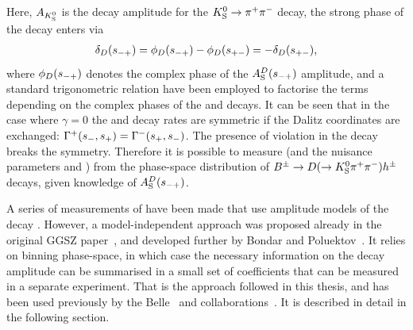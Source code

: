 Here, $A_{{K}^0_{\mathrm{S}}}$ is the decay amplitude for the ${{K}^0_{\mathrm{S}}}\rightarrow{\ensuremath{{\pi}^+}}{\ensuremath{{\pi}^-}}$ decay, the strong phase of the \D decay enters via 
\begin{align}
    {\delta_\D(\smp) = \phi_D(\smp) - \phi_D(\spm) = - \delta_D(\spm)},
\end{align} where $\phi_D(s_{-+})$ denotes the complex phase of the $A_{\rm S}^{D}(s_{-+})$ amplitude, and a standard trigonometric relation have been employed to factorise the terms depending on the complex phases of the \B and \D decays. It can be seen that in the case where $\gamma=0$ the \Bp and \Bm decay rates are symmetric if the Dalitz coordinates are exchanged: $\Gamma^+(s_-, s_+)=\Gamma^-(s_+, s_-)$. The presence of \CP violation in the \B decay breaks the symmetry. Therefore it is possible to measure \g (and the nuisance parameters \rB and \dB) from the phase-space distribution of ${{B}^\pm}\rightarrow{\ensuremath{D}}(\rightarrow{\ensuremath{{K}^0_{\mathrm{S}}}} \pi^+ \pi^-)h^\pm$ decays, given knowledge of $A_{\rm S}^{D}(s_{-+})$.

A series of measurements of \g have been made that use amplitude models of the \D decay \cite{BABAR2005,BABAR2008,BABAR2010, BELLE2004,BELLE2006,BELLE2010,LHCb-PAPER-2014-017,LHCb-PAPER-2016-007}. However, 
a model-independent approach was proposed already in the original GGSZ paper~\cite{giriDeterminingGammaUsing2003}, and developed further by Bondar and Poluektov~\cite{bondarFeasibilityStudyModelindependent2006,bondarUseQuantumcorrelatedD02008}. It relies on binning phase-space, in which case the necessary information on the \D decay amplitude can be summarised in a small set of coefficients that can be measured in a separate experiment. That is the approach followed in this thesis, and has been used previously by the Belle~\cite{BELLEMODIND} and \lhcb collaborations~\cite{LHCb-PAPER-2012-027,LHCb-PAPER-2014-041,LHCb-PAPER-2018-017}. It is described in detail in the following section.


